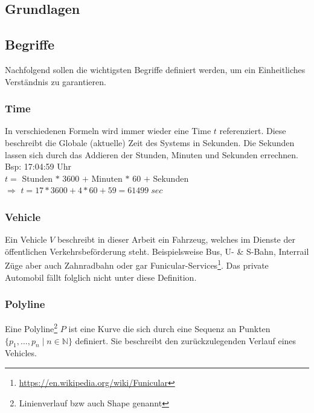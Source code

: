 \begin{newpage}
	
	\section{Grundlagen}
	\label{sec:Grundlagen}

  \subsection{Begriffe}
  \label{sub:begriffe}
    Nachfolgend sollen die wichtigsten Begriffe definiert werden, um ein Einheitliches Verständnis zu garantieren.

    \subsubsection{Time}
    \label{ssub:time}
      In verschiedenen Formeln wird immer wieder eine Time $t$ referenziert. Diese beschreibt die Globale (aktuelle) Zeit des Systems in Sekunden. 
      Die Sekunden lassen sich durch das Addieren der Stunden, Minuten und Sekunden errechnen.\\

      Bsp: 17:04:59 Uhr\\

      $t = $ Stunden $*$ 3600 $+$ Minuten $*$ 60 $+$ Sekunden\\
      $\Rightarrow$ $t = 17 * 3600 + 4 * 60 + 59 = 61499 \; sec$
      

    \subsubsection{Vehicle}
    \label{ssub:vehicle}
      Ein Vehicle $V$ beschreibt in dieser Arbeit ein Fahrzeug, welches im Dienste der öffentlichen Verkehrsbeförderung steht. Beispielsweise Bus, U- \& S-Bahn, Interrail Züge aber auch Zahnradbahn oder gar Funicular-Services\footnote{\url{https://en.wikipedia.org/wiki/Funicular}}. Das private Automobil fällt folglich nicht unter diese Definition.

    \subsubsection{Polyline}
    \label{ssub:polyline}
      Eine Polyline\footnote{Linienverlauf bzw auch Shape genannt} $P$ ist eine Kurve die sich durch eine Sequenz an Punkten $\{ p_1, \dotsc, p_n \;|\; n \in \mathbb{N} \}$ definiert. Sie beschreibt den zurückzulegenden Verlauf eines Vehicles.


\end{newpage}
